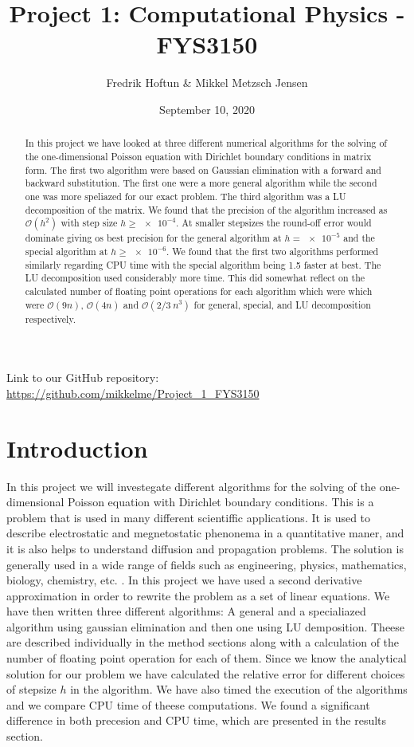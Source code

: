 \documentclass[american,a4paper,12pt]{article}
\title{Project 1: Computational Physics - FYS3150}
\author{Fredrik Hoftun \& Mikkel Metzsch Jensen}
\date{September 10, 2020}
\begin{document}
\maketitle

\begin{abstract}
  In this project we have looked at three different numerical algorithms for the solving of the one-dimensional Poisson equation with Dirichlet boundary conditions in matrix form. The first two algorithm were based on Gaussian elimination with a forward and backward substitution. The first one were a more general algorithm while the second one was more speliazed for our exact problem. The third algorithm was a LU decomposition of the matrix. We found that the precision of the algorithm increased as $\mathcal{O}(h^2)$ with step size $h \ge \num{e-4}$. At smaller stepsizes the round-off error would dominate giving os best precision for the general algorithm at $h = \num{e-5}$ and the special algorithm at $h \ge \num{e-6}$. We found that the first two algorithms performed similarly regarding CPU time with the special algorithm being 1.5 faster at best. The LU decomposition used considerably more time. This did somewhat reflect on the calculated number of floating point operations for each algorithm which were which were $\mathcal{O}(9n)$, $\mathcal{O}(4n)$ and $\mathcal{O}(2/3\ n^3)$ for general, special, and LU decomposition respectively. 
\end{abstract}
\vfill
\footnotesize{{Link to our GitHub repository: \url{https://github.com/mikkelme/Project_1_FYS3150}}} \newpage

\tableofcontents
\newpage


\section{Introduction}
  In this project we will investegate different algorithms for the solving of the one-dimensional Poisson equation with Dirichlet boundary conditions. This is a problem that is used in many different scientiffic applications. It is used to describe electrostatic and megnetostatic phenonema in a quantitative maner, and it is also helps to understand diffusion and propagation problems. The solution is generally used in a wide range of fields such as engineering, physics, mathematics, biology, chemistry, etc. \cite{poisson_paper}. In this project we have used a second derivative approximation in order to rewrite the problem as a set of linear equations. We have then written three different algorithms: A general and a specialiazed algorithm using gaussian elimination and then one using LU demposition. Theese are described individually in the method sections along with a calculation of the number of floating point operation for each of them. Since we know the analytical solution for our problem we have calculated the relative error for different choices of stepsize $h$ in the algorithm. We have also timed the execution of the algorithms and we compare CPU time of theese computations. We found a significant difference in both precesion and CPU time, which are presented in the results section.
\end{document}

